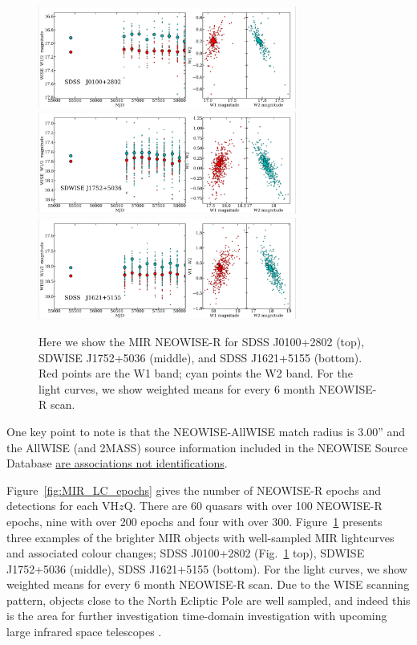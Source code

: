 \documentclass[usenatbib]{mnras}
\begin{document}
\begin{figure}
  \centering
  \includegraphics[width=8.5cm]{figures/NEOWISER_LCs_VHzQs_SDSS_J0100.png}
 \includegraphics[width=8.5cm]{figures/NEOWISER_LCs_VHzQs_SDWISE_J1752.png}
 \includegraphics[width=8.5cm]{figures/NEOWISER_LCs_VHzQs_SDSS_J1621.png}
  \caption[]
  {Here we show the MIR NEOWISE-R for SDSS J0100+2802 (top), SDWISE   J1752+5036 (middle), and  
    SDSS J1621+5155 (bottom). Red points are the W1 band; cyan points the W2 band.
  For the light curves, we show weighted means for every 6 month NEOWISE-R scan.} 
  \label{fig:MIR_LC_3egs}
\end{figure}
One key point to note is that the NEOWISE-AllWISE match radius 
is 3.00'' and the AllWISE (and 2MASS) source information included 
in the NEOWISE Source Database 
\href{http://wise2.ipac.caltech.edu/docs/release/neowise/expsup/sec2_1f.html}{are
associations not identifications}. 

Figure~\ref{fig:MIR_LC_epochs} gives the number of NEOWISE-R epochs and detections for each VH$z$Q. 
There are 60 quasars with over 100 NEOWISE-R epochs, nine with over 200 epochs and four with over 300.
Figure~\ref{fig:MIR_LC_3egs} presents three examples of the brighter MIR objects with well-sampled 
MIR lightcurves and associated colour changes; 
SDSS J0100+2802 (Fig.~\ref{fig:MIR_LC_3egs} top), 
SDWISE  J1752+5036    (middle), 
SDSS J1621+5155 (bottom). 
For the light curves, we show weighted means for every 6 month NEOWISE-R scan.
Due to the WISE scanning pattern, objects close to the North Ecliptic Pole 
are well sampled, and indeed this is the area for further investigation 
time-domain investigation with upcoming large infrared space telescopes
\citep{Jansen2018, White2019AAS}. 
\end{document}
